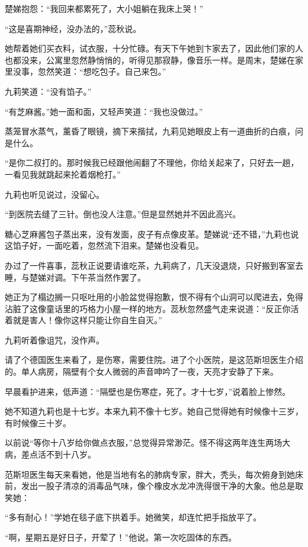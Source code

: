 \par 楚娣抱怨：“我回来都累死了，大小姐躺在我床上哭！”
\par “这是喜期神经，没办法的，”蕊秋说。
\par 她帮着她们买衣料，试衣服，十分忙碌。有天下午她到卞家去了，因此他们家的人也都没来，公寓里忽然静悄悄的，听得见那寂静，像音乐一样。是周末，楚娣在家里没事，忽然笑道：“想吃包子。自己来包。”
\par 九莉笑道：“没有馅子。”
\par “有芝麻酱。”她一面和面，又轻声笑道：“我也没做过。”
\par 蒸笼冒水蒸气，薰昏了眼镜，摘下来揩拭，九莉见她眼皮上有一道曲折的白痕，问是什么。
\par “是你二叔打的。那时候我已经跟他闹翻了不理他，你给关起来了，只好去一趟，一看见我就跳起来抡着烟枪打。”
\par 九莉也听见说过，没留心。
\par “到医院去缝了三针。倒也没人注意。”但是显然她并不因此高兴。
\par 糖心芝麻酱包子蒸出来，没有发面，皮子有点像皮革。楚娣说“还不错，”九莉也说这馅子好，一面吃着，忽然流下泪来。楚娣也没看见。
\par 办过了一件喜事，蕊秋正说要请谁吃茶，九莉病了，几天没退烧，只好搬到客室去睡，与楚娣对调。下午茶当然作罢了。
\par 她正为了榻边搁一只呕吐用的小脸盆觉得抱歉，恨不得有个山洞可以爬进去，免得沾脏了这像童话里的巧格力小屋一样的地方。蕊秋忽然盛气走来说道：“反正你活着就是害人！像你这样只能让你自生自灭。”
\par 九莉听着像诅咒，没作声。
\par 请了个德国医生来看了，是伤寒，需要住院。进了个小医院，是这范斯坦医生介绍的。单人病房，隔壁有个女人微弱的声音呻吟了一夜，天亮才安静了下来。
\par 早晨看护进来，低声道：“隔壁也是伤寒症，死了。才十七岁，”说着脸上惨然。
\par 她不知道九莉也是十七岁。本来九莉不像十七岁。她自己觉得她有时候像十三岁，有时候像三十岁。
\par 以前说“等你十八岁给你做点衣服，”总觉得异常渺茫。怪不得这两年连生两场大病，差点活不到十八岁。
\par 范斯坦医生每天来看她，他是当地有名的肺病专家，胖大，秃头，每次俯身到她床前，发出一股子清凉的消毒品气味，像个橡皮水龙冲洗得很干净的大象。他总是取笑她：
\par “多有耐心！”学她在毯子底下拱着手。她微笑，却连忙把手指放平了。
\par “啊，星期五是好日子，开荤了！”他说。第一次吃固体的东西。
